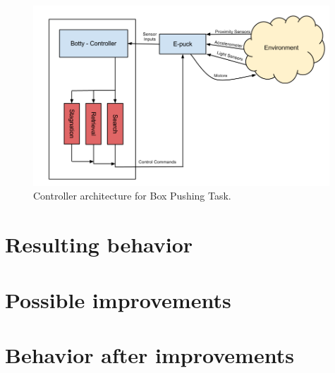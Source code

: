 \documentclass[a4paper,10pt]{article}
\begin{document}
\begin{figure}
  \centering
  \includegraphics[width=0.99\textwidth]{models/SubSym Proj 4 architecture.png}
  \caption{Controller architecture for Box Pushing Task.}
  \label{fig:architecture}
\end{figure}

\section{Resulting behavior}

\section{Possible improvements}

\section{Behavior after improvements}
\end{document}

